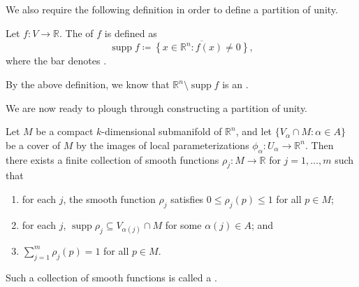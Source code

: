 \documentclass[notoc,notitlepage]{tufte-book}
\DeclareMathOperator{\supp}{supp}
\begin{document}
We also require the following definition in order to define a partition of
unity.

\begin{defn}\label{defn:support_of_a_function}
  Let $f : V \to \mathbb{R}$. The  of $f$ is defined as
  \begin{equation*}
    \supp f \coloneqq \overline{\left\{ x \in \mathbb{R}^n : f(x) \neq 0
    \right\}},
  \end{equation*}
  where the bar denotes .
\end{defn}

\begin{note}
  By the above definition, we know that $\mathbb{R}^n \setminus \supp f$ is an
  .
\end{note}

We are now ready to plough through constructing a partition of unity.

\begin{thm}\label{thm:partition_of_unity}
  Let $M$ be a compact $k$-dimensional submanifold of $\mathbb{R}^n$, and let
  $\{ V_\alpha \cap M : \alpha \in A \}$ be a cover  of $M$ by the images of
  local parameterizations $\phi_{\alpha}: U_{\alpha} \to \mathbb{R}^n$. Then
  there exists a finite collection of smooth functions $\rho_j : M \to
  \mathbb{R}$ for $j = 1, \ldots, m$ such that
  \begin{enumerate}
  \item for each $j$, the smooth function $\rho_j$ satisfies $0 \leq \rho_j(p)
      \leq 1$ for all $p \in M$;
    \item for each $j$, $\supp \rho_j \subseteq V_{\alpha(j)} \cap M$ for some
      $\alpha(j) \in A$; and
    \item $\sum_{j=1}^{m} \rho_j(p) = 1$ for all $p \in M$.
  \end{enumerate}
  Such a collection of smooth functions is called a 
   .
\end{thm}
\end{document}
